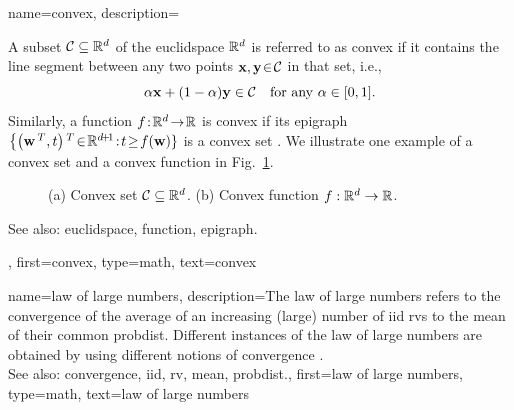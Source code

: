 {name={convex},
	description={A subset $\mathcal{C} \subseteq \mathbb{R}^{d}$ of the 
		\gls{euclidspace} $\mathbb{R}^{d}$ is referred to 
		as convex if it contains the line segment between any two points 
		${\bf x}, {\bf y}\!\in\!\mathcal{C}$ in that set, i.e., 
		$$ \alpha {\bf x} + (1-\alpha) {\bf y} \in \mathcal{C} \quad \mbox{for any } \alpha \in [0,1]. $$
		Similarly, a \gls{function}  
		$f\!:\!\mathbb{R}^{d}\!\rightarrow\!\mathbb{R}$ 
		is convex if its \gls{epigraph} $\big\{ \big( \weights\,^{T},t \big)\,^{T}\!\in\!\mathbb{R}^{\dimlocalmodel\!+\!1}\!:\!t\!\geq\!f(\weights) \}$ 
		is a convex set \cite{BoydConvexBook}. We illustrate one example of a convex set 
		and a convex \gls{function} in Fig.\ \ref{fig_convex_set_function_dict}. 
		\begin{figure}[H]
		\begin{center}
			\vspace*{-8mm}
		\end{center}
		\caption{(a) Convex set $\mathcal{C} \subseteq \mathbb{R}^{d}$. 
			(b) Convex \gls{function} $f: \mathbb{R}^{d} \rightarrow \mathbb{R}$.\label{fig_convex_set_function_dict}}
		\end{figure}
		See also: \gls{euclidspace}, \gls{function}, \gls{epigraph}.},
	first={convex},
	type=math, 
	text={convex}
}

{name={law of large numbers},
	description={The law of large numbers refers to the 
		\gls{convergence} of the average of an increasing (large) number of \gls{iid} \glspl{rv} 
		to the \gls{mean} of their common \gls{probdist}. Different instances of the 
		law of large numbers are obtained by using different notions of \gls{convergence} \cite{papoulis}.
				\\
		See also: \gls{convergence}, \gls{iid}, \gls{rv}, \gls{mean}, \gls{probdist}.},
	first={law of large numbers},
	type=math,
	text={law of large numbers}
}

